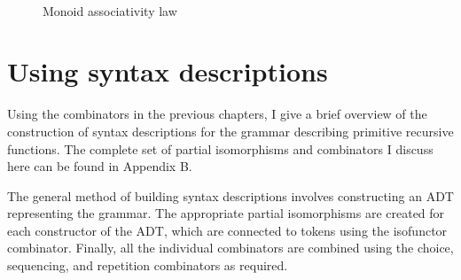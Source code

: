 \documentclass[12pt,a4paper,twoside,openright]{report}
\begin{document}
{\begin{figure}[t] 
\begin{center}
\\ 
\caption{Monoid associativity law}
\end{center}
\label{fig:monoidlaw}
\end{figure}

\section{Using syntax descriptions} \label{use}

Using the combinators in the previous chapters, I give a brief overview of the construction of syntax descriptions for the grammar describing primitive recursive functions. The complete set of partial isomorphisms and combinators I discuss here can be found in Appendix B.

The general method of building syntax descriptions involves constructing an ADT representing the grammar. The appropriate partial isomorphisms are created for each constructor of the ADT, which are connected to tokens using the isofunctor combinator. Finally, all the individual combinators are combined using the choice, sequencing, and repetition combinators as required.

}
\end{document}
